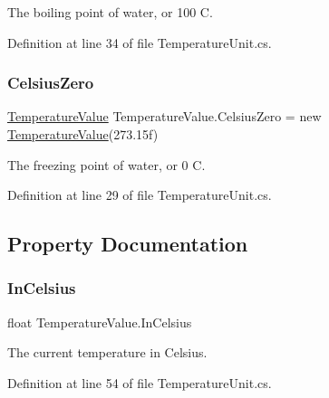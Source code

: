 The boiling point of water, or 100 C. 



Definition at line 34 of file Temperature\+Unit.\+cs.

\mbox{\label{struct_temperature_value_af396a3d096a2b78c7669976a6bf38d16}} 
\subsubsection{\texorpdfstring{Celsius\+Zero}{CelsiusZero}}
{\footnotesize\ttfamily \hyperlink{struct_temperature_value}{Temperature\+Value} Temperature\+Value.\+Celsius\+Zero = new \hyperlink{struct_temperature_value}{Temperature\+Value}(273.\+15f)\hspace{0.3cm}{\ttfamily [static]}}



The freezing point of water, or 0 C. 



Definition at line 29 of file Temperature\+Unit.\+cs.



\subsection{Property Documentation}
\mbox{\label{struct_temperature_value_ab95968d40504a277284efa58d56feb40}} 
\subsubsection{\texorpdfstring{In\+Celsius}{InCelsius}}
{\footnotesize\ttfamily float Temperature\+Value.\+In\+Celsius\hspace{0.3cm}{\ttfamily [get]}}



The current temperature in Celsius. 



Definition at line 54 of file Temperature\+Unit.\+cs.

\mbox{\label{struct_temperature_value_aafb6e7497cc9fb13fc1be03ddb8514da}} 

